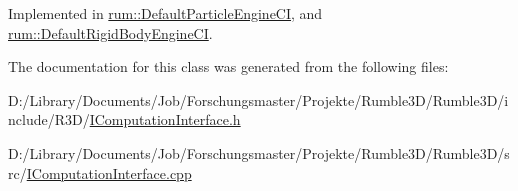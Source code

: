Implemented in \mbox{\hyperlink{classrum_1_1_default_particle_engine_c_i_a1176bc40c952f1be6d61b44bf7eb281c}{rum\+::\+Default\+Particle\+Engine\+CI}}, and \mbox{\hyperlink{classrum_1_1_default_rigid_body_engine_c_i_ae8b25ed02fc8fecc4d606d5c5dad6b4e}{rum\+::\+Default\+Rigid\+Body\+Engine\+CI}}.



The documentation for this class was generated from the following files\+:\begin{DoxyCompactItemize}
\item 
D\+:/\+Library/\+Documents/\+Job/\+Forschungsmaster/\+Projekte/\+Rumble3\+D/\+Rumble3\+D/include/\+R3\+D/\mbox{\hyperlink{_i_computation_interface_8h}{I\+Computation\+Interface.\+h}}\item 
D\+:/\+Library/\+Documents/\+Job/\+Forschungsmaster/\+Projekte/\+Rumble3\+D/\+Rumble3\+D/src/\mbox{\hyperlink{_i_computation_interface_8cpp}{I\+Computation\+Interface.\+cpp}}\end{DoxyCompactItemize}
